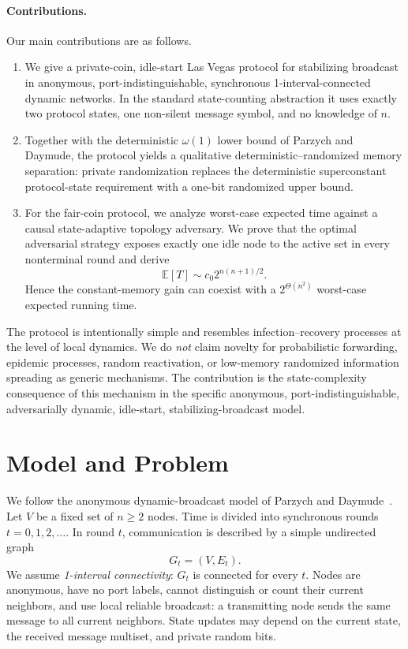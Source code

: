 \documentclass[11pt]{article}
\newcommand{\E}{\mathbb{E}}
\begin{document}
\paragraph{Contributions.}
Our main contributions are as follows.
\begin{enumerate}[leftmargin=1.8em]
  \item We give a private-coin, idle-start Las Vegas protocol for stabilizing broadcast in anonymous, port-indistinguishable, synchronous 1-interval-connected dynamic networks. In the standard state-counting abstraction it uses exactly two protocol states, one non-silent message symbol, and no knowledge of $n$.
  \item Together with the deterministic $\omega(1)$ lower bound of Parzych and Daymude, the protocol yields a qualitative deterministic--randomized memory separation: private randomization replaces the deterministic superconstant protocol-state requirement with a one-bit randomized upper bound.
  \item For the fair-coin protocol, we analyze worst-case expected time against a causal state-adaptive topology adversary. We prove that the optimal adversarial strategy exposes exactly one idle node to the active set in every nonterminal round and derive
  \[
      \E[T]\sim c_0 2^{n(n+1)/2}.
  \]
  Hence the constant-memory gain can coexist with a $2^{\Theta(n^2)}$ worst-case expected running time.
\end{enumerate}

The protocol is intentionally simple and resembles infection--recovery processes at the level of local dynamics. We do \emph{not} claim novelty for probabilistic forwarding, epidemic processes, random reactivation, or low-memory randomized information spreading as generic mechanisms. The contribution is the state-complexity consequence of this mechanism in the specific anonymous, port-indistinguishable, adversarially dynamic, idle-start, stabilizing-broadcast model.

\section{Model and Problem}

We follow the anonymous dynamic-broadcast model of Parzych and Daymude~\cite{ParzychDaymude2024,ParzychDaymude2026}. Let $V$ be a fixed set of $n\ge 2$ nodes. Time is divided into synchronous rounds $t=0,1,2,\ldots$. In round $t$, communication is described by a simple undirected graph
\[
  G_t=(V,E_t).
\]
We assume \emph{1-interval connectivity}: $G_t$ is connected for every $t$. Nodes are anonymous, have no port labels, cannot distinguish or count their current neighbors, and use local reliable broadcast: a transmitting node sends the same message to all current neighbors. State updates may depend on the current state, the received message multiset, and private random bits.
\end{document}
